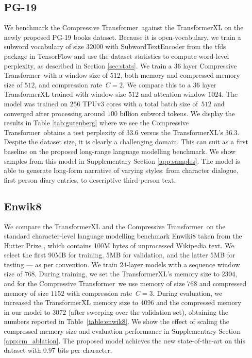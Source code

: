 \subsection{PG-19}

We benchmark the Compressive Transformer~against the TransformerXL on the newly proposed PG-19 books dataset. Because it is open-vocabulary, we train a subword vocabulary of size $32000$ with SubwordTextEncoder from the tfds package in TensorFlow and use the dataset statistics to compute word-level perplexity, as described in Section \ref{sec:stats}.
We train a 36 layer Compressive Transformer~with a window size of $512$, both memory and compressed memory size of $512$, and compression rate~$C=2$. We compare this to a 36 layer TransformerXL trained with window size $512$ and attention window $1024$. The model was trained on $256$ TPUv3 cores with a total batch size of~$512$ and converged after processing around $100$ billion subword tokens. We display the results in Table \ref{tab:gutenberg} where we see the Compressive Transformer~obtains a test perplexity of $33.6$ versus the TransformerXL's $36.3$. Despite the dataset size, it is clearly a challenging domain. This can suit as a first baseline on the proposed long-range language modelling benchmark. We show samples from this model in Supplementary Section \ref{app:samples}. The model is able to generate long-form narrative of varying styles: from character dialogue, first person diary entries, to descriptive third-person text. 

\subsection{Enwik8}
We compare the TransformerXL and the Compressive Transformer~on the standard character-level language modelling benchmark Enwiki8 taken from the Hutter Prize \citep{hutter2012human}, which contains 100M bytes of unprocessed Wikipedia text. We select the first 90MB for training, 5MB for validation, and the latter 5MB for testing --- as per convention.  We train $24$-layer models with a sequence window size of $768$. During training, we set the TransformerXL's memory size to $2304$, and for the Compressive Transformer~we use memory of size $768$ and compressed memory of size $1152$ with compression rate~$C=3$. During evaluation, we increased the TransformerXL memory size to $4096$ and the compressed memory in our model to $3072$ (after sweeping over the validation set), obtaining the numbers reported in Table~\ref{table:enwik8}. We show the effect of scaling the compressed memory size and evaluation performance in Supplementary Section \ref{app:cm_ablation}.
The proposed model achieves the new state-of-the-art on this dataset with $0.97$ bits-per-character.

